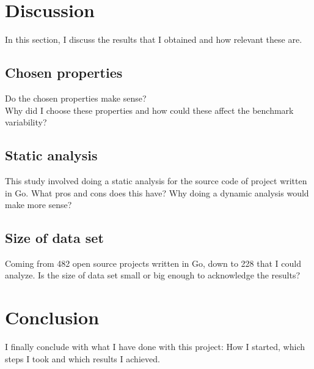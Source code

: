 \documentclass{seal_thesis}
\begin{document}
\chapter{Discussion}
In this section, I discuss the results that I obtained and how relevant these are.
\section{Chosen properties}
Do the chosen properties make sense? \\
Why did I choose these properties and how could these affect the benchmark variability? \\

\section{Static analysis}
This study involved doing a static analysis for the source code of project written in Go. What pros and cons does this have? Why doing a dynamic analysis would make more sense?

\section{Size of data set}
Coming from 482 open source projects written in Go, down to 228 that I could analyze. Is the size of data set small or big enough to acknowledge the results?

\chapter{Conclusion}
I finally conclude with what I have done with this project: How I started, which steps I took and which results I achieved.


\backmatter

{}
\end{document}
